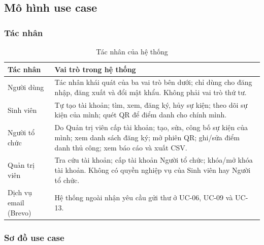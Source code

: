 \subsection{Mô hình use case}
\label{sec:t3-usecase}

\subsubsection{Tác nhân}

\begin{table}[H]
\centering\small
\caption{Tác nhân của hệ thống}\label{tab:t3-actors}
\begin{tabularx}{\linewidth}{@{}p{.20\linewidth}X@{}}
\toprule
\textbf{Tác nhân} & \textbf{Vai trò trong hệ thống}\\\midrule
Người dùng & Tác nhân khái quát của ba vai trò bên dưới; chỉ dùng cho đăng nhập, đăng xuất và đổi mật khẩu. Không phải vai trò thứ tư.\\
Sinh viên & Tự tạo tài khoản; tìm, xem, đăng ký, hủy sự kiện; theo dõi sự kiện của mình; quét QR để điểm danh cho chính mình.\\
Người tổ chức & Do Quản trị viên cấp tài khoản; tạo, sửa, công bố sự kiện của mình; xem danh sách đăng ký; mở phiên QR; ghi/sửa điểm danh thủ công; xem báo cáo và xuất CSV.\\
Quản trị viên & Tra cứu tài khoản; cấp tài khoản Người tổ chức; khóa/mở khóa tài khoản. Không có quyền nghiệp vụ của Sinh viên hay Người tổ chức.\\
Dịch vụ email (Brevo) & Hệ thống ngoài nhận yêu cầu gửi thư ở UC-06, UC-09 và UC-13.\\
\bottomrule
\end{tabularx}
\end{table}

\subsubsection{Sơ đồ use case}


